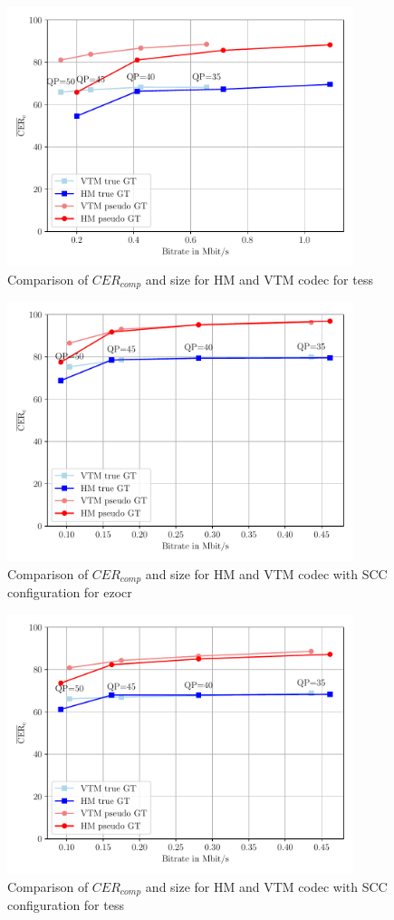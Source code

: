 \begin{figure}[h]
    \centering
    \includegraphics[width=0.9\textwidth]{../images/analyze/codec_cer_size_tess_default.pdf}
    \caption{Comparison of $CER_{comp}$ and size for HM and VTM codec for tess}
    \label{fig:codec_cer_size_tess_default}
\end{figure}

\begin{figure}[h]
    \centering
    \includegraphics[width=0.9\textwidth]{../images/analyze/codec_cer_size_ezocr_scc.pdf}
    \caption{Comparison of $CER_{comp}$ and size for HM and VTM codec with SCC configuration for ezocr}
    \label{fig:codec_cer_size_ezocr_scc}
\end{figure}

\begin{figure}[h]
    \centering
    \includegraphics[width=0.9\textwidth]{../images/analyze/codec_cer_size_tess_scc.pdf}
    \caption{Comparison of $CER_{comp}$ and size for HM and VTM codec with SCC configuration for tess}
    \label{fig:codec_cer_size_tess_scc}
\end{figure}
